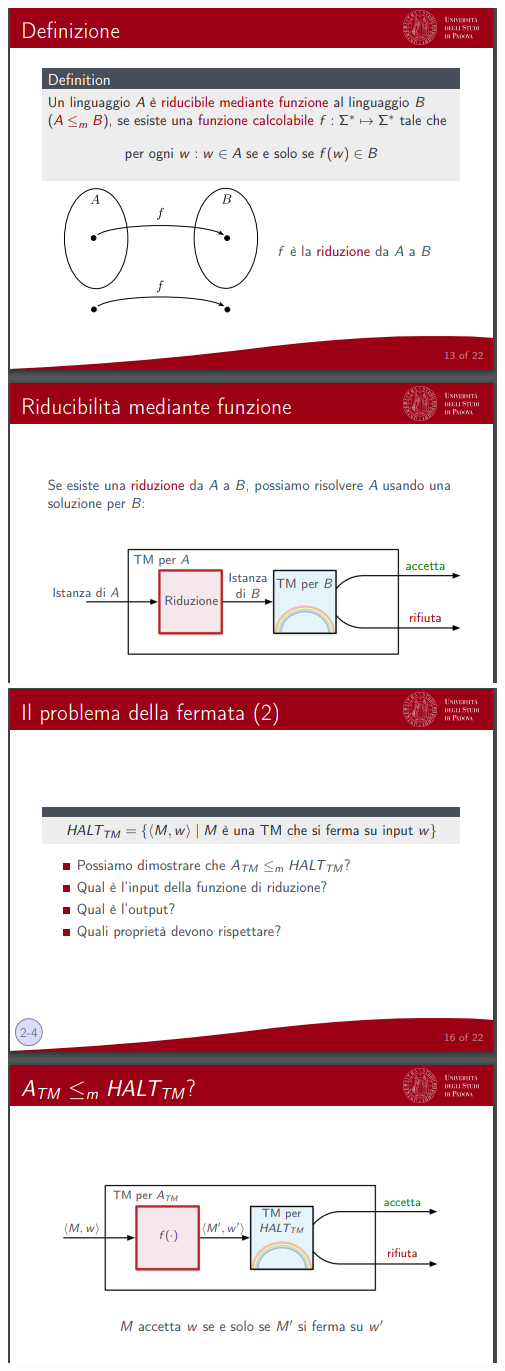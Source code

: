 \documentclass[]{article}
\begin{document}
\begin{center}
					\includegraphics[scale=0.8]{riducibile3.png}
					\includegraphics[scale=0.8]{riducibile4.png}

\end{center}
\end{document}

